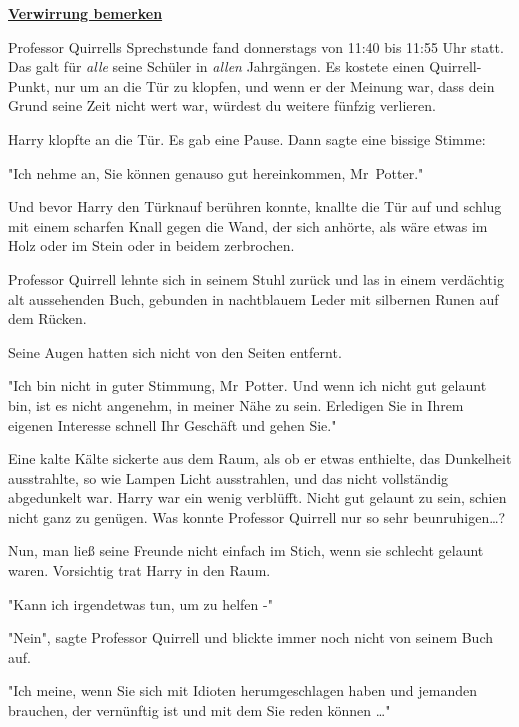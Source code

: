 

\hypertarget{verwirrung-bemerken}{%

\textbf{\uline{Verwirrung bemerken}}

Professor Quirrells Sprechstunde fand donnerstags von 11:40 bis 11:55 Uhr statt. Das galt für \emph{alle} seine Schüler in \emph{allen} Jahrgängen. Es kostete einen Quirrell-Punkt, nur um an die Tür zu klopfen, und wenn er der Meinung war, dass dein Grund seine Zeit nicht wert war, würdest du weitere fünfzig verlieren.

Harry klopfte an die Tür. Es gab eine Pause. Dann sagte eine bissige Stimme:

"Ich nehme an, Sie können genauso gut hereinkommen, Mr~Potter."

Und bevor Harry den Türknauf berühren konnte, knallte die Tür auf und schlug mit einem scharfen Knall gegen die Wand, der sich anhörte, als wäre etwas im Holz oder im Stein oder in beidem zerbrochen.

Professor Quirrell lehnte sich in seinem Stuhl zurück und las in einem verdächtig alt aussehenden Buch, gebunden in nachtblauem Leder mit silbernen Runen auf dem Rücken.

Seine Augen hatten sich nicht von den Seiten entfernt.

"Ich bin nicht in guter Stimmung, Mr~Potter. Und wenn ich nicht gut gelaunt bin, ist es nicht angenehm, in meiner Nähe zu sein. Erledigen Sie in Ihrem eigenen Interesse schnell Ihr Geschäft und gehen Sie."

Eine kalte Kälte sickerte aus dem Raum, als ob er etwas enthielte, das Dunkelheit ausstrahlte, so wie Lampen Licht ausstrahlen, und das nicht vollständig abgedunkelt war. Harry war ein wenig verblüfft. Nicht gut gelaunt zu sein, schien nicht ganz zu genügen. Was konnte Professor Quirrell nur so sehr beunruhigen…?

Nun, man ließ seine Freunde nicht einfach im Stich, wenn sie schlecht gelaunt waren. Vorsichtig trat Harry in den Raum.

"Kann ich irgendetwas tun, um zu helfen -"

"Nein", sagte Professor Quirrell und blickte immer noch nicht von seinem Buch auf.

"Ich meine, wenn Sie sich mit Idioten herumgeschlagen haben und jemanden brauchen, der vernünftig ist und mit dem Sie reden können …"

}
